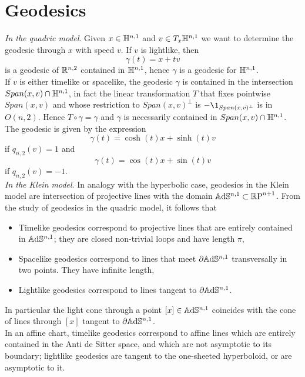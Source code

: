 \section{Geodesics}\label{sec:geodesic}
\textit{In the quadric model}. Given $x\in \mathbb{H}^{n,1}$ and $v \in T_x \mathbb{H}^{n,1}$ we want to determine the geodesic through $x$ with speed $v$.
If $v$ is lightlike, then
\[
\gamma(t) = x + tv
\]
is a geodesic of $\mathbb{R}^{n,2}$ contained in $\mathbb{H}^{n,1}$, hence $\gamma$ is a geodesic for $\mathbb{H}^{n,1}$.\\
If $v$ is either timelike or spacelike, the geodesic $\gamma$ is contained in the intersection $Span(x,v) \cap \mathbb{H}^{n,1}$, in fact the linear transformation $T$ that fixes pointwise $Span(x,v)$ and whose restriction to $Span(x,v)^\perp$ is $-\1_{Span(x,v)^\perp}$ is in $O(n,2)$. Hence $T \circ \gamma = \gamma$ and $\gamma$ is necessarily contained in $Span(x,v) \cap \mathbb{H}^{n,1}$. The geodesic is given by the expression
\[
\gamma(t) = \cosh(t)x + \sinh(t)v
\]
if $q_{n,2}(v)= 1$ and 
\[
\gamma(t) = \cos(t)x + \sin(t)v
\] 
if $q_{n,2}(v)= -1$.\\

\noindent \textit{In the Klein model}. In analogy with the hyperbolic case, geodesics in the Klein model are intersection of projective lines with the domain $\mathbb{A}\mathrm{d}\mathbb{S}^{n,1} \subset \mathbb{R}\text{P}^{n+1}$. From the study of geodesics in the quadric model, it follows that
\begin{itemize}
    \item Timelike geodesics correspond to projective lines that are entirely contained in $\mathbb{A}\mathrm{d}\mathbb{S}^{n,1}$; they are closed non-trivial loops and have length $\pi$,
    \item Spacelike geodesics correspond to lines that meet $\partial\mathbb{A}\mathrm{d}\mathbb{S}^{n,1}$ transversally in two points. They have infinite length, 
    \item Lightlike geodesics correspond to lines tangent to $\partial\mathbb{A}\mathrm{d}\mathbb{S}^{n,1}$.
\end{itemize}
In particular the light cone through a point $\left[ x \right] \in \mathbb{A}\mathrm{d}\mathbb{S}^{n,1}$ coincides with the cone of lines through $\left[ x \right]$ tangent to $\partial \mathbb{A}\mathrm{d}\mathbb{S}^{n,1}$.\\
In an affine chart, timelike geodesics correspond to affine lines which are entirely contained in the Anti de Sitter space, and which are not asymptotic to its boundary; lightlike geodesics are tangent to the one-sheeted hyperboloid, or are asymptotic to it.\\

